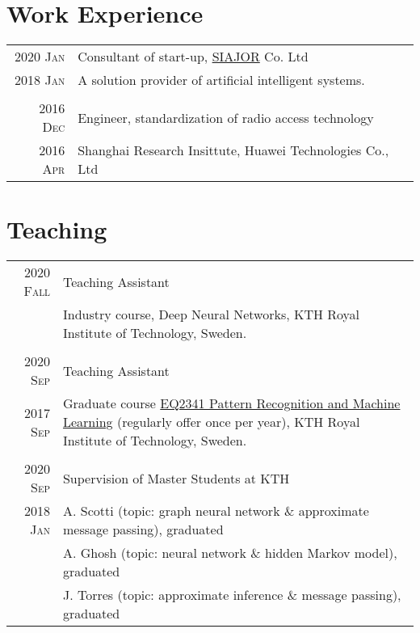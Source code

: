 \documentclass[a4paper,10pt]{article}
\begin{document}
\section{Work Experience}
\begin{tabular}{r|p{13cm}}
  \textsc{2020 Jan}  & Consultant of start-up, \href{http://www.siajor.com/}{SIAJOR} Co. Ltd \\
  \textsc{2018 Jan}  & A solution provider of artificial intelligent systems. \\
  \multicolumn{2}{c}{} \\

  \textsc{2016 Dec}  & Engineer, standardization of radio access technology  \\
  \textsc{2016 Apr}  & Shanghai Research Insittute, Huawei Technologies Co., Ltd \\
\end{tabular}

\section{Teaching}
\begin{tabular}{r|p{13cm}}
  \textsc{2020 Fall}  & Teaching Assistant \\
                      & Industry course, {Deep Neural Networks}, KTH Royal Institute of Technology, Sweden.\\
  \multicolumn{2}{c}{} \\

  \textsc{2020 Sep}  & Teaching Assistant \\
  \textsc{2017 Sep}  & Graduate course \href{https://www.kth.se/student/kurser/kurs/EQ2341?l=en}{EQ2341 Pattern Recognition and Machine Learning} (regularly offer once per year), KTH Royal Institute of Technology, Sweden.\\
  \multicolumn{2}{c}{} \\

  \textsc{2020 Sep}  & Supervision of Master Students at KTH \\
  \textsc{2018 Jan}  & A. Scotti (topic: graph neural network \& approximate message passing), graduated \\
                      & A. Ghosh (topic: neural network \& hidden Markov model), graduated \\
                      & J. Torres (topic: approximate inference \& message passing), graduated
\end{tabular}
\end{document}
